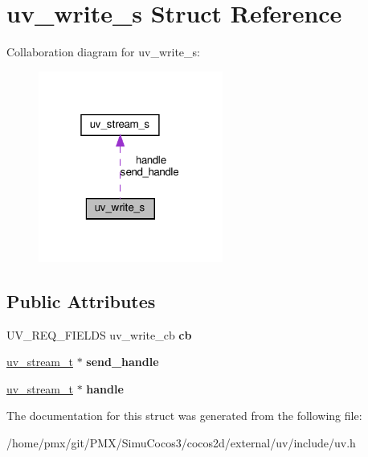 \hypertarget{structuv__write__s}{}\section{uv\+\_\+write\+\_\+s Struct Reference}
\label{structuv__write__s}


Collaboration diagram for uv\+\_\+write\+\_\+s\+:
\nopagebreak
\begin{figure}[H]
\begin{center}
\leavevmode
\includegraphics[width=172pt]{structuv__write__s__coll__graph}
\end{center}
\end{figure}
\subsection*{Public Attributes}
\begin{DoxyCompactItemize}
\item 
\mbox{\label{structuv__write__s_afc9df4b96d228f86ab086e31c1cde85e}} 
U\+V\+\_\+\+R\+E\+Q\+\_\+\+F\+I\+E\+L\+DS uv\+\_\+write\+\_\+cb {\bfseries cb}
\item 
\mbox{\label{structuv__write__s_a3d98b8c2a08115d17d01ab7c6a7393fb}} 
\hyperlink{structuv__stream__s}{uv\+\_\+stream\+\_\+t} $\ast$ {\bfseries send\+\_\+handle}
\item 
\mbox{\label{structuv__write__s_ac5347f35c62ede1d6e2d81f1e4ba3992}} 
\hyperlink{structuv__stream__s}{uv\+\_\+stream\+\_\+t} $\ast$ {\bfseries handle}
\end{DoxyCompactItemize}


The documentation for this struct was generated from the following file\+:\begin{DoxyCompactItemize}
\item 
/home/pmx/git/\+P\+M\+X/\+Simu\+Cocos3/cocos2d/external/uv/include/uv.\+h\end{DoxyCompactItemize}

